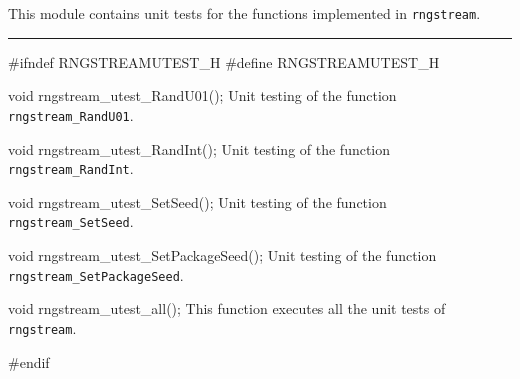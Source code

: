 
This module contains unit tests for the functions implemented in {\tt rngstream}. 

\bigskip
\hrule
\code
\hide
#ifndef RNGSTREAMUTEST_H
#define RNGSTREAMUTEST_H
\endhide
\endcode

\code
void rngstream_utest_RandU01();
\endcode
 \tab  Unit testing of the function {\tt rngstream\_RandU01}.
 \endtab
\code

void rngstream_utest_RandInt();
\endcode
 \tab  Unit testing of the function {\tt rngstream\_RandInt}.
 \endtab
\code

void rngstream_utest_SetSeed();
\endcode
 \tab  Unit testing of the function {\tt rngstream\_SetSeed}.
 \endtab
\code

void rngstream_utest_SetPackageSeed();
\endcode
 \tab  Unit testing of the function {\tt rngstream\_SetPackageSeed}.
 \endtab
\code

void rngstream_utest_all();
\endcode
 \tab  This function executes all the unit tests of {\tt rngstream}.
 \endtab
\code


\hide
#endif
\endhide
\endcode
